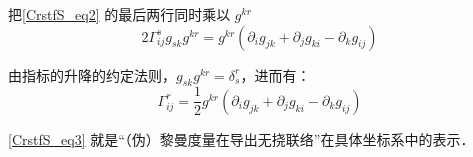 把\autoref{CrstfS_eq2} 的最后两行同时乘以 $g^{kr}$
\begin{equation}
2\Gamma^{s}_{ij}g_{sk}g^{kr}=g^{kr}(\partial_ig_{jk}+\partial_jg_{ki}-\partial_kg_{ij})
\end{equation}

由指标的升降的约定法则，$g_{sk}g^{kr}=\delta_s^r$，进而有：
\begin{equation}\label{CrstfS_eq3}
\Gamma^{r}_{ij}=\frac{1}{2}g^{kr}(\partial_ig_{jk}+\partial_jg_{ki}-\partial_kg_{ij})
\end{equation}

\autoref{CrstfS_eq3} 就是“（伪）黎曼度量在导出无挠联络”在具体坐标系中的表示．






